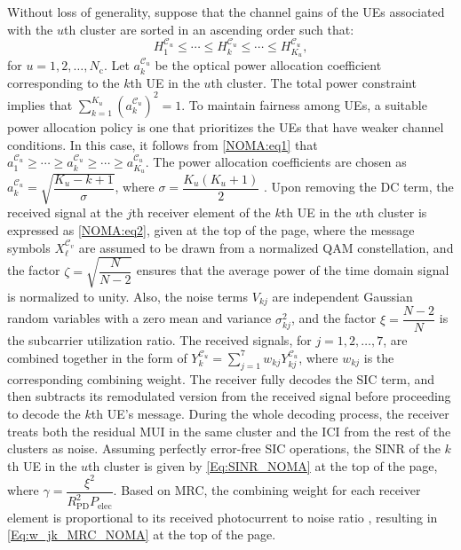\documentclass[lettersize,journal]{IEEEtran}
\begin{document}
Without loss of generality, suppose that the channel gains of the \acp{UE} associated with the $u$th cluster are sorted in an ascending order such that:
%
\begin{equation}\label{NOMA:eq1}
    H_1^{\mathcal{C}_u} \leq \cdots \leq H_k^{\mathcal{C}_u} \leq \cdots \leq H_{K_u}^{\mathcal{C}_u},
\end{equation}
%
for $u=1,2,\dots,N_\mathrm{c}$. Let $a_k^{\mathcal{C}_u}$ be the optical power allocation coefficient corresponding to the $k$th \ac{UE} in the $u$th cluster. The total power constraint implies that $\sum\limits_{k=1}^{K_u}\left(a_k^{\mathcal{C}_u}\right)^{\!2}=1$. To maintain fairness among \acp{UE}, a suitable power allocation policy is one that prioritizes the \acp{UE} that have weaker channel conditions. In this case, it follows from \eqref{NOMA:eq1} that $a_1^{\mathcal{C}_u} \geq \cdots \geq a_k^{\mathcal{C}_u} \geq \cdots \geq a_{K_u}^{\mathcal{C}_u}$. The power allocation coefficients are chosen as $a_k^{\mathcal{C}_u}=\sqrt{\dfrac{K_u-k+1}{\sigma}}$, where $\sigma=\dfrac{K_u(K_u+1)}{2}$ \cite{ZhiguoNOMA2014}. Upon removing the \ac{DC} term, the received signal at the $j$th receiver element of the $k$th \ac{UE} in the $u$th cluster is expressed as \eqref{NOMA:eq2}, given at the top of the page, where the message symbols $X_\ell^{\mathcal{C}_v}$ are assumed to be drawn from a normalized \ac{QAM} constellation, and the factor $\zeta=\sqrt{\dfrac{N}{N-2}}$ ensures that the average power of the time domain signal is normalized to unity. Also, the noise terms $V_{kj}$ are independent Gaussian random variables with a zero mean and variance $\sigma_{kj}^2$, and the factor $\xi=\dfrac{N-2}{N}$ is the subcarrier utilization ratio. The received signals, for $j=1,2,\dots,7$, are combined together in the form of $Y_k^{\mathcal{C}_u} = \sum\limits_{j=1}^{7}w_{kj} Y_{kj}^{\mathcal{C}_u}$, where $w_{kj}$ is the corresponding combining weight. The receiver fully decodes the \ac{SIC} term, and then subtracts its remodulated version from the received signal before proceeding to decode the $k$th \ac{UE}'s message. During the whole decoding process, the receiver treats both the residual \ac{MUI} in the same cluster and the \ac{ICI} from the rest of the clusters as noise. Assuming perfectly error-free \ac{SIC} operations, the \ac{SINR} of the $k$th \ac{UE} in the $u$th cluster is given by \eqref{Eq:SINR_NOMA} at the top of the page, where $\gamma=\dfrac{\xi^2}{R_\mathrm{PD}^2 P_\mathrm{elec}}$.
Based on \ac{MRC}, the combining weight for each receiver element is proportional to its received photocurrent to noise ratio \cite{JCarruther2000angle}, resulting in \eqref{Eq:w_jk_MRC_NOMA} at the top of the page.
\end{document}
